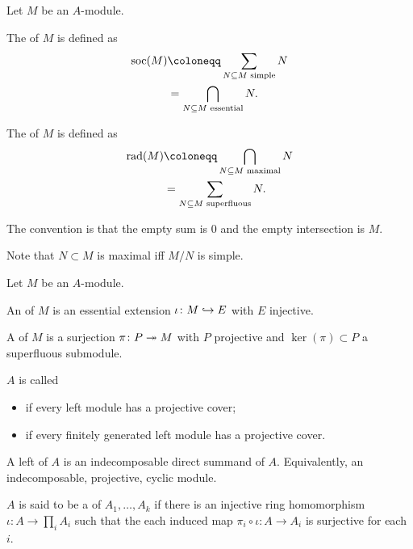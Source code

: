 \documentclass[12pt]{article}
\begin{document}
\begin{defn}
	Let $M$ be an $A$-module. 

	The  of $M$ is defined as
	\begin{align*} 
		\soc(M) &\coloneqq \sum_{N \subset M \text{ simple}} N\\
		&= \bigcap_{N \subset M \text{ essential}} N.
	\end{align*} 

	The  of $M$ is defined as
	\begin{align*} 
		\rad(M) &\coloneqq \bigcap_{N \subset M \text{ maximal}} N \\
		&= \sum_{N \subset M \text{ superfluous}} N.
	\end{align*}

	The convention is that the empty sum is $0$ and the empty intersection is $M$.
\end{defn}
Note that $N \subset M$ is maximal iff $M/N$ is simple.

\begin{defn}
	Let $M$ be an $A$-module. 

	An  of $M$ is an essential extension $\iota \colon M \hookrightarrow E$ with $E$ injective.

	A  of $M$ is a surjection $\pi \colon P \twoheadrightarrow M$ with $P$ projective and $\ker(\pi) \subset P$ a superfluous submodule.
\end{defn}

\begin{defn}
	$A$ is called
	\begin{itemize}
		\item {} if every left module has a projective cover;
		\item {} if every finitely generated left module has a projective cover.
	\end{itemize}
\end{defn}

\begin{defn}
	A left  of $A$ is an indecomposable direct summand of $A$. 
	Equivalently, an indecomposable, projective, cyclic module.
\end{defn}

\begin{defn} \label{defn:subdirect-product}
	$A$ is said to be a  of $A_{1}, \ldots, A_{k}$  if 
	there is an injective ring homomorphism $\iota \colon A \to \prod_{i} A_{i}$ such that 
	the each induced map $\pi_{i} \circ \iota \colon A \to A_{i}$ is surjective for each $i$.
\end{defn}
\end{document}
